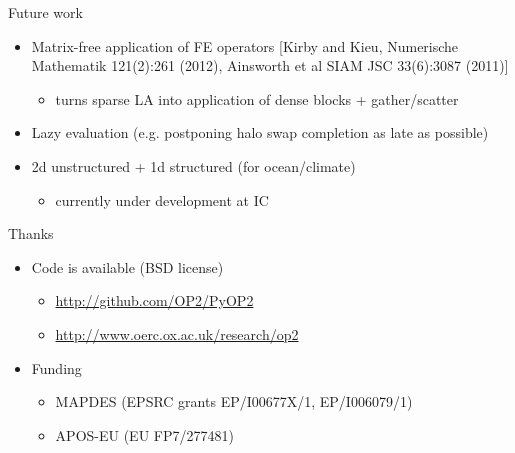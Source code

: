 \documentclass[presentation]{beamer}
\begin{document}
\begin{frame}[label={sec:orgheadline22}]{Future work}
\begin{itemize}
\item Matrix-free application of FE operators
\scriptsize [Kirby and Kieu, Numerische Mathematik 121(2):261 (2012), Ainsworth
et al SIAM JSC 33(6):3087 (2011)]
\begin{itemize}
\item turns sparse LA into application of dense
blocks + gather/scatter
\end{itemize}

\item Lazy evaluation (e.g. postponing halo swap completion as late as possible)

\item 2d unstructured + 1d structured (for ocean/climate)
\begin{itemize}
\item currently under development at IC
\end{itemize}
\end{itemize}
\end{frame}

\begin{frame}[label={sec:orgheadline23}]{Thanks}
\begin{itemize}
\item Code is available (BSD license)
\begin{itemize}
\item \url{http://github.com/OP2/PyOP2}
\item \url{http://www.oerc.ox.ac.uk/research/op2}
\end{itemize}
\item Funding
\begin{itemize}
\item MAPDES (EPSRC grants EP/I00677X/1, EP/I006079/1)
\item APOS-EU (EU FP7/277481)
\end{itemize}
\end{itemize}
\end{frame}
\end{document}

